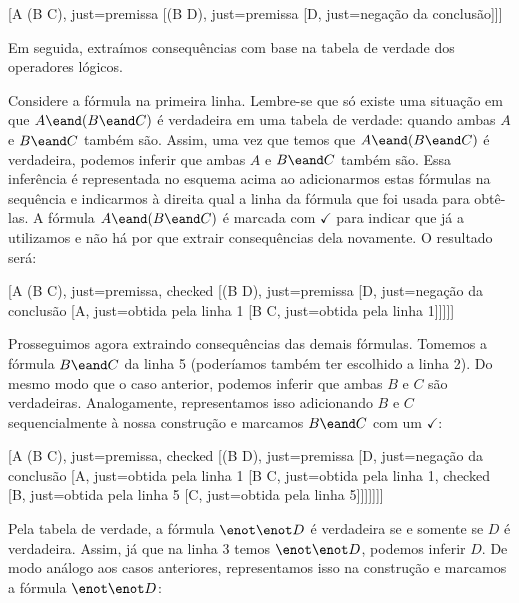 \begin{center}
\begin{tableau}
	{
	}
	[A \eand (B \eand C), just={premissa}
	[\enot(B \eand D), just={premissa}
	[\enot \enot D, just={negação da conclusão}]]]
\end{tableau}
\end{center}

Em seguida, extraímos consequências com base na tabela de verdade dos operadores lógicos.

Considere a fórmula na primeira linha. Lembre-se que só existe uma situação em que $A \eand (B \eand C)$ é verdadeira em uma tabela de verdade: quando ambas $A$ e $B \eand C$ também são.
Assim, uma vez que temos que $A \eand (B \eand C)$ é verdadeira, podemos inferir que  ambas $A$ e $B \eand C$ também são.
Essa inferência é representada no esquema acima ao adicionarmos estas fórmulas na sequência e indicarmos à direita qual a linha da fórmula que foi usada para obtê-las.
A fórmula $A \eand (B \eand C)$  é marcada com $\checkmark$  para indicar que já a utilizamos e não há por que extrair consequências dela novamente.
O resultado será:

\begin{center}
\begin{tableau}
	{
	}
	[A \eand (B \eand C), just={premissa}, checked
	[\enot(B \eand D), just={premissa}
	[\enot \enot D, just={negação da conclusão}
	[A, just={obtida pela linha 1}
	[B \eand C, just={obtida pela linha 1}]]]]]
\end{tableau}
\end{center}

Prosseguimos agora extraindo consequências das demais fórmulas.
Tomemos a fórmula $B \eand C$ da linha 5 (poderíamos também ter escolhido a linha 2).
Do mesmo modo que o caso anterior, podemos inferir que ambas $B$ e $C$ são verdadeiras.
Analogamente, representamos isso adicionando $B$ e $C$ sequencialmente à nossa construção e marcamos $B \eand C$ com um $\checkmark$:
\begin{center}
\begin{tableau}
	{
	}
	[A \eand (B \eand C), just={premissa}, checked
	[\enot(B \eand D), just={premissa}
	[\enot \enot D, just={negação da conclusão}
	[A, just={obtida pela linha 1}
	[B \eand C, just={obtida pela linha 1}, checked
	[B, just={obtida pela linha 5}
	[C, just={obtida pela linha 5}]]]]]]]
\end{tableau}
\end{center}


Pela tabela de verdade, a fórmula $\enot \enot D$ é verdadeira se e somente se $D$ é verdadeira.  Assim, já que na linha 3 temos $\enot \enot D$,  podemos inferir $D$. De modo análogo aos casos anteriores, representamos isso na construção e marcamos a fórmula $\enot \enot D$:

